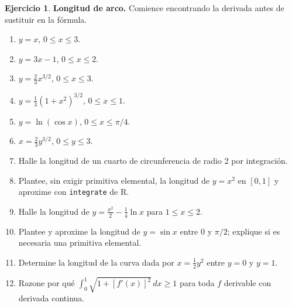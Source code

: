 \documentclass[12pt]{article}
\theoremstyle{definition}
\newtheorem{Ejer}[teorema]{Ejercicio}
\theoremstyle{remark}
\begin{document}
\begin{Ejer}\textbf{Longitud de arco.} Comience encontrando la derivada antes de sustituir en la fórmula.
\begin{enumerate}[resume=banco3]
\item $y=x$, $0\le x\le3$.
\item $y=3x-1$, $0\le x\le2$.
\item $y=\frac23x^{3/2}$, $0\le x\le3$.
\item $y=\frac13(1+x^2)^{3/2}$, $0\le x\le1$.
\item $y=\ln(\cos x)$, $0\le x\le\pi/4$.
\item $x=\frac23y^{3/2}$, $0\le y\le3$.
\item Halle la longitud de un cuarto de circunferencia de radio $2$ por integración.
\item Plantee, sin exigir primitiva elemental, la longitud de $y=x^2$ en $[0,1]$ y aproxime con \texttt{integrate} de R.
\item Halle la longitud de $y=\tfrac{x^2}{2}-\tfrac14\ln x$ para $1\le x\le2$.
\item Plantee y aproxime la longitud de $y=\sin x$ entre $0$ y $\pi/2$; explique si es necesaria una primitiva elemental.
\item Determine la longitud de la curva dada por $x=\tfrac12y^2$ entre $y=0$ y $y=1$.
\item Razone por qué $\int_0^1\sqrt{1+[f'(x)]^2}\,dx\ge1$ para toda $f$ derivable con derivada continua.
\end{enumerate}
\end{Ejer}
\end{document}
